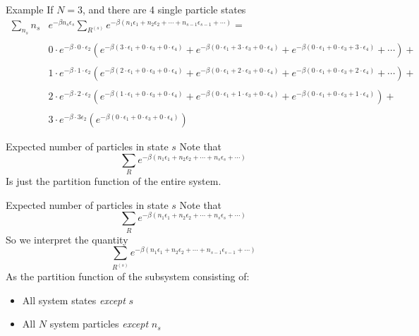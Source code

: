 \documentclass{beamer}
\begin{document}
\begin{frame}{Example}
	If $N=3$, and there are 4 single particle states
	\footnotesize
	\begin{align*}
		\sum_{n_s}n_s&e^{-\beta n_s\epsilon_s}\sum_{R^{(s)}}e^{-\beta\left(n_1\epsilon_1+n_2\epsilon_2+\cdots+n_{s-1}\epsilon_{s-1}+\cdots\right)}=\\\\
		&0\cdot e^{-\beta\cdot 0\cdot \epsilon_2}\left(e^{-\beta\left(3\cdot\epsilon_1+0\cdot\epsilon_3+0\cdot\epsilon_4\right)}+e^{-\beta\left(0\cdot \epsilon_1+3\cdot\epsilon_3+0\cdot\epsilon_4\right)}+e^{-\beta\left(0\cdot\epsilon_1+0\cdot\epsilon_3+3\cdot\epsilon_4\right)}+\cdots\right)+\\ \\
		&1\cdot e^{-\beta\cdot 1\cdot\epsilon_2}\left(e^{-\beta\left(2\cdot\epsilon_1+0\cdot\epsilon_3+0\cdot\epsilon_4\right)}+e^{-\beta\left(0\cdot\epsilon_1+2\cdot\epsilon_3+0\cdot\epsilon_4\right)}+e^{-\beta\left(0\cdot\epsilon_1+0\cdot\epsilon_3+2\cdot\epsilon_4\right)}+\cdots\right)+\\ \\
		&2\cdot e^{-\beta\cdot 2\cdot\epsilon_2}\left(e^{-\beta\left(1\cdot\epsilon_1+0\cdot\epsilon_3+0\cdot\epsilon_4\right)}+e^{-\beta\left(0\cdot\epsilon_1+1\cdot\epsilon_3+0\cdot\epsilon_4\right)}+e^{-\beta\left(0\cdot\epsilon_1+0\cdot\epsilon_3+1\cdot\epsilon_4\right)}\right)+\\ \\
		&3\cdot e^{-\beta\cdot 3\epsilon_2}\left(e^{-\beta\left(0\cdot\epsilon_1+0\cdot\epsilon_3+0\cdot\epsilon_4\right)}\right)
	\end{align*}
\end{frame}



\begin{frame}{Expected number of particles in state $s$}
	Note that 
	\begin{equation*}
		\sum_{R}e^{-\beta\left(n_1\epsilon_1+n_2\epsilon_2+\cdots+n_s\epsilon_s+\cdots\right)}
	\end{equation*}
	Is just the partition function of the entire system.
\end{frame}



\begin{frame}{Expected number of particles in state $s$}
	Note that 
	\begin{equation*}
			\sum_{R}e^{-\beta\left(n_1\epsilon_1+n_2\epsilon_2+\cdots+n_s\epsilon_s+\cdots\right)}
	\end{equation*}
	So we interpret the quantity
	\begin{equation*}
		\sum_{R^{(s)}}e^{-\beta\left(n_1\epsilon_1+n_2\epsilon_2+\cdots+n_{s-1}\epsilon_{s-1}+\cdots\right)}
	\end{equation*}
As the partition function of the subsystem consisting of:
\begin{itemize}
	\item All system states \textit{except} $s$
	\item All $N$ system particles \textit{except} $n_s$
\end{itemize}
\end{frame}
\end{document}
